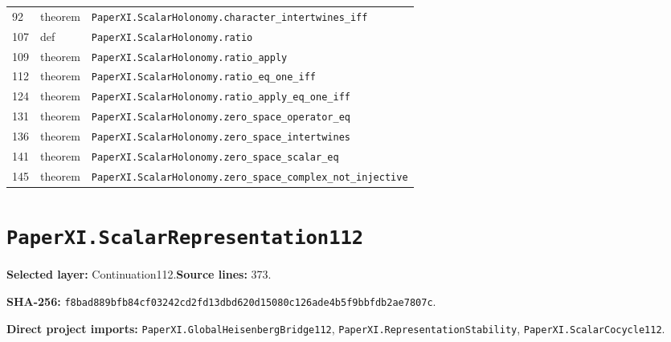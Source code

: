 \documentclass[10pt,oneside]{book}
\begin{document}
\begin{longtable}{@{}p{}p{}p{}@{}}
92&theorem&\nolinkurl{PaperXI.ScalarHolonomy.character_intertwines_iff}\\

107&def&\nolinkurl{PaperXI.ScalarHolonomy.ratio}\\

109&theorem&\nolinkurl{PaperXI.ScalarHolonomy.ratio_apply}\\

112&theorem&\nolinkurl{PaperXI.ScalarHolonomy.ratio_eq_one_iff}\\

124&theorem&\nolinkurl{PaperXI.ScalarHolonomy.ratio_apply_eq_one_iff}\\

131&theorem&\nolinkurl{PaperXI.ScalarHolonomy.zero_space_operator_eq}\\

136&theorem&\nolinkurl{PaperXI.ScalarHolonomy.zero_space_intertwines}\\

141&theorem&\nolinkurl{PaperXI.ScalarHolonomy.zero_space_scalar_eq}\\

145&theorem&\nolinkurl{PaperXI.ScalarHolonomy.zero_space_complex_not_injective}\\

\bottomrule\end{longtable}

\section{\texorpdfstring{\nolinkurl{PaperXI.ScalarRepresentation112}}{PaperXI.ScalarRepresentation112}}\label{module:PaperXI.ScalarRepresentation112}

\textbf{Selected layer:} Continuation112.\quad\textbf{Source lines:} 373.\par\textbf{SHA-256:} {\scriptsize\nolinkurl{f8bad889bfb84cf03242cd2fd13dbd620d15080c126ade4b5f9bbfdb2ae7807c}}.


\textbf{Direct project imports:} \nolinkurl{PaperXI.GlobalHeisenbergBridge112}, \nolinkurl{PaperXI.RepresentationStability}, \nolinkurl{PaperXI.ScalarCocycle112}.
\end{document}
